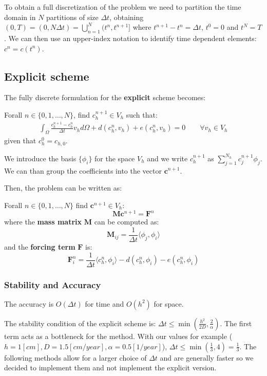 \documentclass[12pt, letterpaper]{article}
\begin{document}
\noindent To obtain a full discretization of the problem we need to partition the time domain in $N$ partitions of size $\Delta t$, obtaining $(0, T)=(0,N\Delta t)=\bigcup_{n=1}^N(t^n, t^{n+1}]$ where $t^{n+1}-t^n=\Delta t$, $t^0=0$ and $t^N=T$. We can then use an upper-index notation to identify time dependent elements: $c^n = c(t^n)$.

\subsection{Explicit scheme}

The fully discrete formulation for the \textbf{explicit} scheme becomes:

\vspace{1em}
\noindent
Forall $n\in \{0,1,\dots,N\}$, find $c_h^{n+1}\in V_h$ such that:
\begin{gather}
\int_\Omega\frac{c_h^{n+1}-c_h^n}{\Delta t}v_hd\Omega+d(c_h^n,v_h)+e(c_h^n,v_h)=0
\qquad \forall v_h \in V_h
\end{gather}
given that $c_h^0 = c_{h,0}$.

\noindent We introduce the basis $\{\phi_i\}$ for the space $V_h$ and we write $c_h^{n+1}$ as $\sum_{j=1}^{N_h}c^{n+1}_j\phi_j$. We can than group the coefficients into the vector $\mathbf{c}^{n+1}$. 

\noindent Then, the problem can be written as:

\vspace{1em}
\noindent
Forall $n\in\{0,1,\dots,N\}$ find $\mathbf{c}^{n+1}\in V_h$:
$$\mathbf{M}\mathbf{c}^{n+1}=\mathbf{F}^n$$
where the \textbf{mass matrix} $\mathbf{M}$ can be computed as:
$$\mathbf{M}_{ij}=\frac1{\Delta t}\langle\phi_j,\phi_i\rangle$$
and the \textbf{forcing term} $\mathbf{F}$ is:
$$\mathbf{F}_i^n=\frac1{\Delta t}\langle c_h^n,\phi_i\rangle-d(c_h^n,\phi_i)-e(c_h^n,\phi_i)$$

\subsubsection{Stability and Accuracy}
The accuracy is $O(\Delta t)$ for time and $O(h^2)$ for space.

\noindent The stability condition of the explicit scheme is: $\Delta t\leq\min(\frac{h^2}{2D}, \frac2\alpha)$. The first term acts as a bottleneck for the method. With our values for example ($h=1[cm], D=1.5[cm/year], \alpha=0.5[1/year]$), $\Delta t\leq\min(\frac13, 4)=\frac13$. The following methods allow for a larger choice of $\Delta t$ and are generally faster so we decided to implement them and not implement the explicit version.
\end{document}
